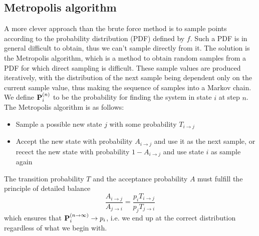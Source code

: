 \documentclass[english, a4paper]{article}
\begin{document}
\subsection{Metropolis algorithm}

A more clever approach than the brute force method is to sample points according to the probability distribution (PDF)
defined by $f$. Such a PDF is in general difficult to obtain, thus we can't sample directly from it.
The solution is the Metropolis algorithm, which is a method to obtain random samples from a PDF for which 
direct sampling is difficult. 
These sample values are produced iteratively, with the distribution of the next sample being dependent only on 
the current sample value, thus making the sequence of samples into a Markov chain.
We define ${\bf P}_i^{(n)}$ to be the 
probability for finding the system in state $i$ at step $n$. 
The Metropolis algorithm is as follows:
\begin{itemize}
 \item Sample a possible new state $j$ with some probability $T_{i\rightarrow j}$
 \item Accept the new state with probability $A_{i\rightarrow j}$ and use it as the next sample, or
 recect the new state with probability $1 - A_{i\rightarrow j}$ and use state $i$ as sample again
\end{itemize}
The transition probability $T$ and the acceptance probability $A$ must fulfill the principle of detailed balance
\begin{equation}
 \frac{A_{i\rightarrow j}}{A_{j\rightarrow i}} = \frac{p_i T_{i\rightarrow j}}{p_j T_{j\rightarrow i}}
 \label{detailedbalance}
\end{equation}
which ensures that ${\bf P}_i^{(n\rightarrow \infty)} \rightarrow p_i$, i.e. we end up at the correct 
distribution regardless of what we begin with. \\
\end{document}
